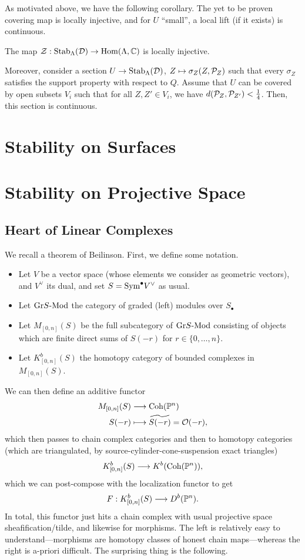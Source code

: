 \documentclass[12pt]{article}
\DeclareMathOperator{\Stab}{Stab}
\newcommand{\cZ}{\mathcal{Z}}
\begin{document}
As motivated above, we have the following corollary. The yet to be proven covering map is locally injective, and for $U$ ``small'', a local lift (if it exists) is continuous.

\begin{cor}
    The map $\cZ: \Stab_{\Lambda}(\cD) \to \Hom(\Lambda,\C)$ is locally injective. 

    Moreover, consider a section $U\to \Stab_\Lambda(\cD)$, $Z\mapsto \sigma_Z(Z,\cP_Z)$ such that every $\sigma_Z$ satisfies the support property with respect to $Q$. Assume that $U$ can be covered by open subsets $V_i$ such that for all $Z,Z'\in V_i$, we have $d(\cP_Z,\cP_{Z'}) < \frac{1}{4}$. Then, this section is continuous.
\end{cor}


\section{Stability on Surfaces}

\section{Stability on Projective Space}

\subsection{Heart of Linear Complexes}

We recall a theorem of Beilinson. First, we define some notation.
\begin{itemize}
    \item Let $V$ be a vector space (whose elements we consider as geometric vectors), and $V^\vee$ its dual, and set $S= \Sym^\bullet V^\vee$ as usual.
    \item Let $\grlMod{S}$ the category of graded (left) modules over $S_\bullet$
    \item Let $M_{[0,n]}(S)$ be the full subcategory of $\grlMod{S}$ consisting of objects which are finite direct sums of $S(-r)$ for $r\in \{0,\dots,n\}$.
    \item Let $K^b_{[0,n]}(S)$ the homotopy category of bounded complexes in $M_{[0,n]}(S)$.
\end{itemize}

We can then define an additive functor
\begin{align*}
    M_{[0,n]}(S) &\longrightarrow \Coh(\P^n)\\
    S(-r) &\longmapsto \tilde{S(-r)}=\cO(-r),
\end{align*}
which then passes to chain complex categories and then to homotopy categories (which are triangulated, by source-cylinder-cone-suspension exact triangles)
\[K^b_{[0,n]}(S) \longrightarrow K^b(\Coh(\P^n)),\]
which we can post-compose with the localization functor to get
\[F: K^b_{[0,n]}(S) \longrightarrow D^b(\P^n).\]
In total, this functor just hits a chain complex with usual projective space sheafification/tilde, and likewise for morphisms. The left is relatively easy to understand---morphisms are homotopy classes of honest chain maps---whereas the right is a-priori difficult. The surprising thing is the following.
\end{document}
